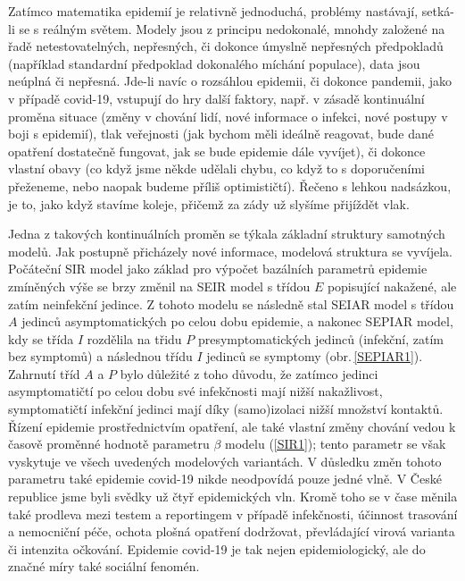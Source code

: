 Zatímco matematika epidemií je relativně jednoduchá, problémy nastávají, setká-li se s reálným světem. Modely jsou z principu nedokonalé, mnohdy založené na řadě netestovatelných, nepřesných, či dokonce úmyslně nepřesných předpokladů (například standardní předpoklad dokonalého míchání populace), data jsou neúplná či nepřesná. Jde-li navíc o rozsáhlou epidemii, či dokonce pandemii, jako v případě covid-19, vstupují do hry další faktory, např. v zásadě kontinuální proměna situace (změny v chování lidí, nové informace o infekci, nové postupy v boji s epidemií), tlak veřejnosti (jak bychom měli ideálně reagovat, bude dané opatření dostatečně fungovat, jak se bude epidemie dále vyvíjet), či dokonce vlastní obavy (co když jsme někde udělali chybu, co když to s doporučeními přeženeme, nebo naopak budeme příliš optimističtí). Řečeno s lehkou nadsázkou, je to, jako když stavíme koleje, přičemž za zády už slyšíme přijíždět vlak. 

Jedna z takových kontinuálních proměn se týkala základní struktury samotných modelů. Jak postupně přicházely nové informace, modelová struktura se vyvíjela. Počáteční SIR model jako základ pro výpočet bazálních parametrů epidemie zmíněných výše se brzy změnil na SEIR model s třídou $E$ popisující nakažené, ale zatím neinfekční jedince. Z tohoto modelu se následně stal SEIAR model s třídou $A$ jedinců asymptomatických po celou dobu epidemie, a nakonec SEPIAR model, kdy se třída $I$ rozdělila na třidu $P$ presymptomatických jedinců (infekční, zatím bez symptomů) a následnou třídu $I$ jedinců se symptomy (obr.\,\ref{SEPIAR1}). Zahrnutí tříd $A$ a $P$ bylo důležité z toho důvodu, že zatímco jedinci asymptomatičtí po celou dobu své infekčnosti mají nižší nakažlivost, symptomatičtí infekční jedinci mají díky (samo)izolaci nižší množství kontaktů. Řízení epidemie prostřednictvím opatření, ale také vlastní změny chování vedou k časově proměnné hodnotě parametru $\beta$ modelu (\ref{SIR1}); tento parametr se však vyskytuje ve všech uvedených modelových variantách. V důsledku změn tohoto parametru také epidemie covid-19 nikde neodpovídá pouze jedné vlně. V České republice jsme byli svědky už čtyř epidemických vln. Kromě toho se v čase měnila také prodleva mezi testem a reportingem v případě infekčnosti, účinnost trasování a nemocniční péče, ochota plošná opatření dodržovat, převládající virová varianta či intenzita očkování. Epidemie covid-19 je tak nejen epidemiologický, ale do značné míry také sociální fenomén.   

